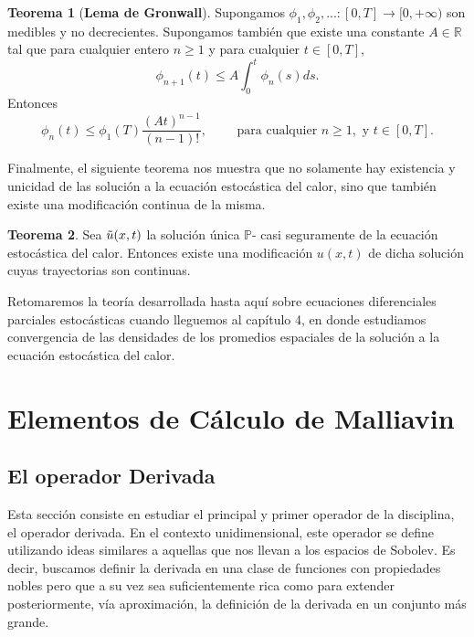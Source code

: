 \documentclass[letterpaper,twoside,12pt]{book}
\newcommand{\R}{\mathbb{R}}
\renewcommand{\P}{\mathbb{P}}
\newcommand{\1}{\mathds{1}}
\renewcommand{\to}{\rightarrow}
\theoremstyle{definition}
\theoremstyle{definition}
\newtheorem{teo}{Teorema}
\theoremstyle{definition}
\theoremstyle{definition}
\theoremstyle{definition}
\theoremstyle{definition}
\theoremstyle{definition}
\begin{document}
\begin{teo}[\textbf{Lema de Gronwall}] 
 Supongamos $\phi_1,\phi_2,...:[0,T]\to[0,+\infty)$ son medibles y no decrecientes. Supongamos también que existe una constante $A\in \R$ tal que para cualquier entero $n\geq1$ y para cualquier $t\in[0,T]$,
 \[
 \phi_{n+1}(t)\leq A\int_{0}^{t}\phi_n(s)ds.   
 \]
 Entonces 
 \[
 \phi_n(t)\leq \phi_1(T)\frac{(At)^{n-1}}{(n-1)!}, \qquad \text{ para cualquier }n\geq1, \text{ y } t\in[0,T].   
 \]
 \end{teo}
Finalmente, el siguiente teorema nos muestra que no solamente hay existencia y unicidad de las solución a la ecuación estocástica del calor, sino que también existe una modificación continua de la misma.

\begin{teo} 
 Sea $\Tilde{u}(x,t)$ la solución única $\P$- casi seguramente de la ecuación estocástica del calor. Entonces existe una modificación $u(x,t)$ de dicha solución cuyas trayectorias son continuas.
 \end{teo}

Retomaremos la teoría desarrollada hasta aquí sobre ecuaciones diferenciales parciales estocásticas cuando lleguemos al capítulo 4, en donde estudiamos convergencia de las densidades de los promedios espaciales de la solución a la ecuación estocástica del calor. 


\chapter{Elementos de Cálculo de Malliavin}%
\section{El operador Derivada}
Esta sección consiste en estudiar el principal y primer operador de la disciplina, el operador derivada. En el contexto unidimensional, este operador se define utilizando
ideas similares a aquellas que nos llevan a los espacios de Sobolev. Es decir, buscamos definir la derivada en una clase de funciones con propiedades nobles pero 
que a su vez sea suficientemente rica como para extender posteriormente, vía aproximación, la definición de la derivada en un conjunto más grande.
\end{document}
